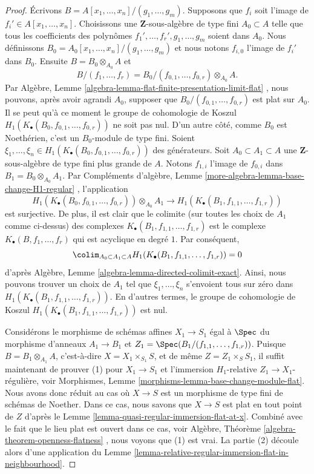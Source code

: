 \begin{proof}
\medskip\noindent
Écrivons  $B = A[x_1, \ldots, x_n]/(g_1, \ldots, g_m)$. Supposons que  $f_i$  soit l'image de  $f_i' \in A[x_1, \ldots, x_n]$.
Choisissons une  $\mathbf{Z}$-sous-algèbre de type fini  $A_0 \subset A$  telle que tous
les coefficients des polynômes  $f_1', \ldots, f_r', g_1, \ldots, g_m$  soient dans  $A_0$. Nous
définissons  $B_0 = A_0[x_1, \ldots, x_n]/(g_1, \ldots, g_m)$  et nous notons  $f_{i, 0}$  l'image de  $f_i'$  dans
 $B_0$. Ensuite  $B = B_0 \otimes_{A_0} A$  et
$$
B/(f_1, \ldots, f_r) =
B_0/(f_{0, 1}, \ldots, f_{0, r}) \otimes_{A_0} A.
$$
Par Algèbre, Lemme  \ref{algebra-lemma-flat-finite-presentation-limit-flat} , nous pouvons, après avoir agrandi  $A_0$,
supposer que  $B_0/(f_{0, 1}, \ldots, f_{0, r})$  est plat sur  $A_0$. Il se peut qu'à ce moment le
groupe de cohomologie de Koszul  $H_1(K_\bullet(B_0, f_{0, 1}, \ldots, f_{0, r}))$  ne soit pas nul. D'un autre côté,
comme  $B_0$  est Noethérien, c'est un  $B_0$-module de type fini.
Soient  $\xi_1, \ldots, \xi_n \in H_1(K_\bullet(B_0, f_{0, 1}, \ldots, f_{0, r}))$  des générateurs. Soit  $A_0 \subset A_1 \subset A$  une
 $\mathbf{Z}$-sous-algèbre de type fini plus grande de  $A$. Notons
 $f_{1, i}$  l'image de  $f_{0, i}$  dans  $B_1 = B_0 \otimes_{A_0} A_1$. Par Compléments d'algèbre,
Lemme  \ref{more-algebra-lemma-base-change-H1-regular} , l'application
$$
H_1(K_\bullet(B_0, f_{0, 1}, \ldots, f_{0, r})) \otimes_{A_0} A_1
\longrightarrow
H_1(K_\bullet(B_1, f_{1, 1}, \ldots, f_{1, r}))
$$
est surjective. De plus, il est clair que le colimite (sur toutes les choix de
 $A_1$  comme ci-dessus) des complexes  $K_\bullet(B_1, f_{1, 1}, \ldots, f_{1, r})$  est le complexe
 $K_\bullet(B, f_1, \ldots, f_r)$  qui est acyclique en degré  $1$. Par conséquent,
$$
\colim_{A_0 \subset A_1 \subset A}
H_1(K_\bullet(B_1, f_{1, 1}, \ldots, f_{1, r}))
= 0
$$
d'après Algèbre, Lemme  \ref{algebra-lemma-directed-colimit-exact}. Ainsi, nous pouvons trouver un choix de
 $A_1$  tel que  $\xi_1, \ldots, \xi_n$  s'envoient tous sur zéro dans  $H_1(K_\bullet(B_1, f_{1, 1}, \ldots, f_{1, r}))$. En
d'autres termes, le groupe de cohomologie de Koszul  $H_1(K_\bullet(B_1, f_{1, 1}, \ldots, f_{1, r}))$  est nul.

\medskip\noindent
Considérons le morphisme de schémas affines  $X_1 \to S_1$  égal à  $\Spec$  du
morphisme d'anneaux  $A_1 \to B_1$  et  $Z_1 = \Spec(B_1/(f_{1, 1}, \ldots, f_{1, r}))$. Puisque  $B = B_1 \otimes_{A_1} A$,
c'est-à-dire  $X = X_1 \times_{S_1} S$, et de même  $Z = Z_1 \times_S S_1$, il suffit maintenant de
prouver (1) pour  $X_1 \to S_1$  et l'immersion  $H_1$-relative
 $Z_1 \to X_1$-régulière, voir Morphismes, Lemme  \ref{morphisms-lemma-base-change-module-flat}. Nous avons donc
réduit au cas où  $X \to S$  est un morphisme de type fini de schémas de Noether.
Dans ce cas, nous savons que  $X \to S$  est plat en tout point de  $Z$ 
d'après le Lemme  \ref{lemma-quasi-regular-immersion-flat-at-x}. Combiné avec le fait que le lieu plat est ouvert
dans ce cas, voir Algèbre, Théorème  \ref{algebra-theorem-openness-flatness} , nous voyons que (1) est vrai. La
partie (2) découle alors d'une application du Lemme  \ref{lemma-relative-regular-immersion-flat-in-neighbourhood}.
\end{proof}

